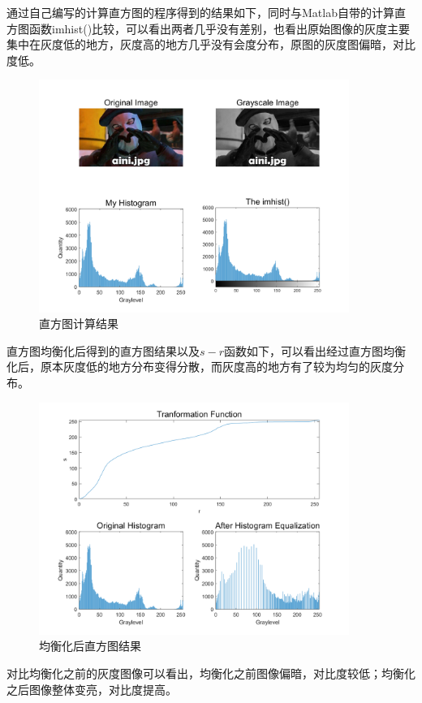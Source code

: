 \documentclass{../source/Experiment}
\begin{document}
通过自己编写的计算直方图的程序得到的结果如下，同时与Matlab自带的计算直方图函数imhist()比较，可以看出两者几乎没有差别，也看出原始图像的灰度主要集中在灰度低的地方，灰度高的地方几乎没有会度分布，原图的灰度图偏暗，对比度低。
\begin{figure}[H]
    \centering
    \includegraphics[width = 0.9\textwidth]{第一次/hw1-1.png}
    \caption{直方图计算结果}
\end{figure}

直方图均衡化后得到的直方图结果以及$s-r$函数如下，可以看出经过直方图均衡化后，原本灰度低的地方分布变得分散，而灰度高的地方有了较为均匀的灰度分布。
\begin{figure}[H]
    \centering
    \includegraphics[width = 0.9\textwidth]{第一次/hw1-2.png}
    \caption{均衡化后直方图结果}
\end{figure}

对比均衡化之前的灰度图像可以看出，均衡化之前图像偏暗，对比度较低；均衡化之后图像整体变亮，对比度提高。
\end{document}
